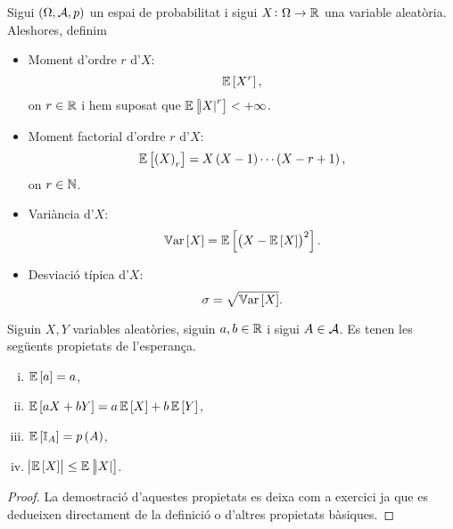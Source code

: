 \begin{defi}
    Sigui $\left(\Omega,\mathcal{A},p\right)$ un espai de probabilitat i sigui $X\colon\Omega\to\mathbb{R}$ una variable aleatòria. Aleshores, definim
    \begin{itemize}
        \item Moment d'ordre $r$ d'$X$: 
            \[
                \operatorname{\mathbb{E}}\left[ X^r\right],
            \]
            on $r\in\mathbb{R}$ i hem suposat que $\operatorname{\mathbb{E}}\left[\abs{X}^r\right]<+\infty$.
        \item Moment factorial d'ordre $r$ d'$X$: 
            \[
                \operatorname{\mathbb{E}}\left[ \left( X\right)_r\right]=X\left( X-1\right)\cdots\left( X-r+1\right),
            \]
            on $r\in\mathbb{N}$.
        \item Variància d'$X$:
            \[
                \operatorname{\mathbb{V}ar}\left[ X\right]=\operatorname{\mathbb{E}}\left[\left( X-\operatorname{\mathbb{E}}\left[ X\right]\right)^2\right].
            \]
        \item Desviació típica d'$X$:
            \[
                \sigma=\sqrt{\operatorname{\mathbb{V}ar}\left[ X\right]}.
            \]
    \end{itemize}
\end{defi}

\begin{prop}
    Siguin $X, Y$ variables aleatòries, siguin $a, b\in\mathbb{R}$ i sigui $A\in\mathcal{A}$. Es tenen les següents propietats de l'esperança.
    \begin{enumerate}[i)]
        \item $\operatorname{\mathbb{E}}\left[ a\right]=a$,
        \item $\operatorname{\mathbb{E}}\left[ aX+bY\right]=a\operatorname{\mathbb{E}}\left[ X\right]+b\operatorname{\mathbb{E}}\left[ Y\right]$,
        \item $\operatorname{\mathbb{E}}\left[ \mathbb{I}_A\right]=p\left( A\right)$,
        \item $\abs{\operatorname{\mathbb{E}}\left[ X\right]}\leq\operatorname{\mathbb{E}}\left[\abs{X}\right]$.
    \end{enumerate}
\end{prop}
\begin{proof}
 La demostració d'aquestes propietats es deixa com a exercici ja que es dedueixen directament de la definició o d'altres propietats bàsiques.
\end{proof}

